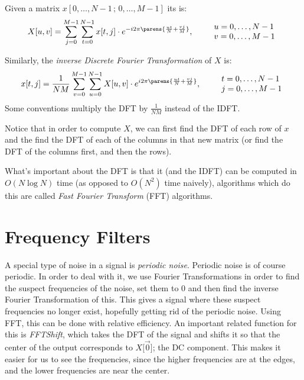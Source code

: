 \documentclass[10pt]{article}
\begin{document}
\begin{defn*}

    Given a matrix $x[0,\dots,N-1\,;\,0,\dots,M-1]$ its  is:
    \[ X[u,v] = \sum_{j=0}^{M-1}\sum_{t=0}^{N-1} x[t,j]\cdot e^{-i2\pi\parens{\frac{ut}N+\frac{vj}M}},\qquad \begin{array}{l}u=0,\dots,N-1\\v=0,\dots,M-1\end{array} \]

\end{defn*}

Similarly, the \emph{inverse Discrete Fourier Transformation} of $X$ is:
\[ x[t,j] = \frac1{NM}\sum_{v=0}^{M-1}\sum_{u=0}^{N-1}X[u,v]\cdot e^{i2\pi\parens{\frac{ut}N+\frac{vj}M}},\qquad \begin{array}{l}t=0,\dots,N-1\\j=0,\dots,M-1\end{array} \]
Some conventions multiply the DFT by $\frac1{NM}$ instead of the IDFT.

Notice that in order to compute $X$, we can first find the DFT of each row of $x$ and the find the DFT of each of the columns in that new matrix (or find the DFT of the columns first, and then the rows).

What's important about the DFT is that it (and the IDFT) can be computed in $O(N\log N)$ time (as opposed to $O(N^2)$ time naively), algorithms which do this are called \emph{Fast Fourier Transform} (FFT)
algorithms.

\section{Frequency Filters}

A special type of noise in a signal is \emph{periodic noise}.
Periodic noise is of course periodic.
In order to deal with it, we use Fourier Transformations in order to find the suspect frequencies of the noise, set them to $0$ and then find the inverse Fourier Transformation of this.
This gives a signal where these suspect frequencies no longer exist, hopefully getting rid of the periodic noise.
Using FFT, this can be done with relative efficiency.
An important related function for this is \emph{FFTShift}, which takes the DFT of the signal and shifts it so that the center of the output corresponds to $X\bigl[\vec0\bigr]$; the DC component.
This makes it easier for us to see the frequencies, since the higher frequencies are at the edges, and the lower frequencies are near the center.
\end{document}
